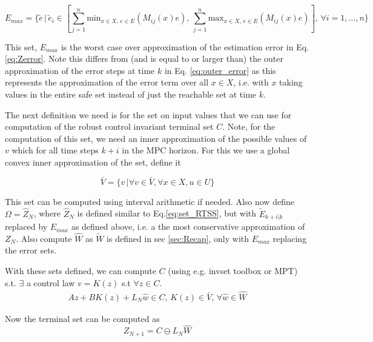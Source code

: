 \documentclass{article}[14pt]
\begin{document}
\begin{equation}
E_{max} = \{\tilde{e}\,|\,\tilde{e}_i\in[\sum_{j=1}^n \text{min}_{x\in X,\,e\in E}(M_{ij}(x)e),\, \sum_{j=1}^n \text{max}_{x\in X,\,e\in E}(M_{ij}(x)e)],\,\forall i=1,\dotsc,n\}
\end{equation}

This set, $E_{max}$ is the worst case over approximation of the estimation error in Eq.\ref{eq:Zerror}. Note this differs from (and is equal to or larger than) the outer approximation of the error steps at time $k$ in Eq. \ref{eq:outer_error} as this represents the approximation of the error term over all $x\in X$, i.e. with $x$ taking values in the entire safe set instead of just the reachable set at time $k$.

The next definition we need is for the set on input values that we can use for computation of the robust control invariant terminal set $C$. Note, for the computation of this set, we need an inner approximation of the possible values of $v$ which for all time steps $k+i$ in the MPC horizon. For this we use a global convex inner approximation of the set, define it

\begin{equation}
\bar{V} = \{v\,|\forall v\in \bar{V},\forall x\in X, u\in U\}
\end{equation}

This set can be computed using interval arithmetic if needed. Also now define $\Omega=\hat{Z}_N$, where $\hat{Z}_N$ is defined similar to Eq.\ref{eq:set_RTSS}, but with $\tilde{E}_{k+i|k}$ replaced by $E_{max}$ as defined above, i.e. a the most conservative approximation of $Z_N$. Also compute $\hat{W}$ as $\tilde{W}$ is defined in sec \ref{sec:Recap}, only with $E_{max}$ replacing the error sets.

With these sets defined, we can compute $C$ (using e.g. invset toolbox or MPT) s.t. $\exists$ a control law $v=K(z)$ s.t $\forall z \in C$.
\begin{subequations}
\begin{align}
Az+BK(z)+L_N\hat{w}\in C,\, K(z)\in \bar{V}, \,\forall \hat{w} \in \hat{W}
\end{align}
\end{subequations}

Now the terminal set can be computed as 
\begin{equation}
Z_{N+1}=C\ominus L_N\hat{W}
\end{equation}
\end{document}
